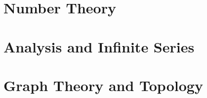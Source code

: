 \documentclass[11pt,a4paper,twoside]{book}
\theoremstyle{eulerstyle}
\theoremstyle{definition}
\begin{document}
\cleardoublepage

\mainmatter

\part{Number Theory}
\parttoc



\cleardoublepage



\cleardoublepage



\cleardoublepage

\part{Analysis and Infinite Series}
\parttoc



\cleardoublepage



\cleardoublepage



\cleardoublepage

\part{Graph Theory and Topology}
\parttoc


\end{document}
